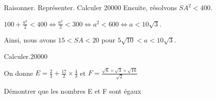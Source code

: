 \begin{pageParcourst}
\begin{ExoCtN}{Raisonner. Représenter. Calculer }{2}{0}{0}{0}{0}
Ensuite, résolvons $SA^2<400$.

$100+\frac{a^2}{2}<400\Leftrightarrow\frac{a^2}{2}<300\Leftrightarrow a^2<600\Leftrightarrow a<10\sqrt{3}$.

Ainsi, nous avons $15 < SA < 20$ pour $5\sqrt{10}<a<10\sqrt{3}$.
\end{ExoCtN}



\begin{ExoCtN}{Calculer.}{2}{0}{0}{0}{0}
 
On donne $E = \frac{2}{3}+\frac{17}{2} \times \frac{4}{3}$ et $F = \frac{\sqrt 6 \times \sqrt 3\times \sqrt{16} }{\sqrt 2}  $ 
 
Démontrer que les nombres E et F sont égaux
\end{ExoCtN}

 

%


 
\end{pageParcourst} %


